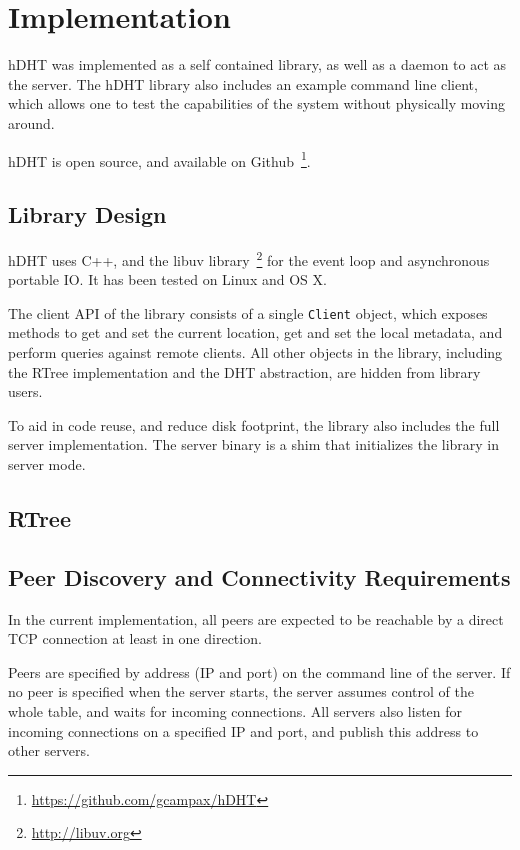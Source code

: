 \section{Implementation} \label{section:implementation}

hDHT was implemented as a self contained library, as well as a daemon to act as the server.
The hDHT library also includes an example command line client, which allows one to test the capabilities of the system without physically moving around.

hDHT is open source, and available on Github~\footnote{\url{https://github.com/gcampax/hDHT}}.

\subsection{Library Design}

hDHT uses C++, and the libuv library~\footnote{\url{http://libuv.org}} for the event loop and asynchronous portable IO.
It has been tested on Linux and OS X.

The client API of the library consists of a single \texttt{Client} object, which exposes methods to get and set the current location, get and set the local metadata, and perform queries against remote clients.
All other objects in the library, including the RTree implementation and the DHT abstraction, are hidden from library users.

To aid in code reuse, and reduce disk footprint, the library also includes the full server implementation. The server binary is a shim that initializes the library in server mode.

\subsection{RTree}

\subsection{Peer Discovery and Connectivity Requirements}

In the current implementation, all peers are expected to be reachable by a direct TCP connection at least in one direction.

Peers are specified by address (IP and port) on the command line of the server.
If no peer is specified when the server starts, the server assumes control of the whole table, and waits for incoming connections.
All servers also listen for incoming connections on a specified IP and port, and publish this address to other servers.

